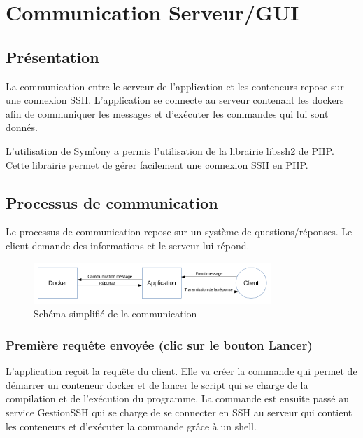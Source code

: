 \section{Communication Serveur/GUI}

\subsection{Présentation}

\par La communication entre le serveur de l'application et les conteneurs repose sur une connexion SSH. L'application se connecte au serveur contenant les dockers afin de communiquer les messages et d'exécuter les commandes qui lui sont donnés.

\par L'utilisation de Symfony a permis l'utilisation de la librairie libssh2 de PHP. Cette librairie permet de gérer facilement une connexion SSH en PHP.

\subsection{Processus de communication}

\par Le processus de communication repose sur un système de questions/réponses. Le client demande des informations et le serveur lui répond.

\begin{figure}[H]
\centering
\includegraphics[width=0.8\textwidth]{./img/communication/com.png}
\caption{Schéma simplifié de la communication}
\end{figure}


\subsubsection{Première requête envoyée (clic sur le bouton Lancer)}

\par L'application reçoit la requête du client. Elle va créer la commande qui permet de démarrer un conteneur docker et de lancer le script qui se charge de la compilation et de l'exécution du programme. La commande est ensuite passé au service GestionSSH qui se charge de se connecter en SSH au serveur qui contient les conteneurs et d'exécuter la commande grâce à un shell. 

